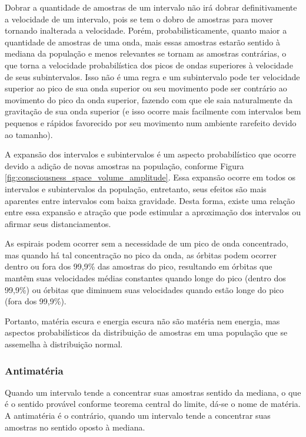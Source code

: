 Dobrar a quantidade de amostras de um intervalo não irá dobrar definitivamente a velocidade de um intervalo, pois se tem o dobro de amostras para mover tornando inalterada a velocidade. Porém, probabilisticamente, quanto maior a quantidade de amostras de uma onda, mais essas amostras estarão sentido à mediana da população e menos relevantes se tornam as amostras contrárias, o que torna a velocidade probabilística dos picos de ondas superiores à velocidade de seus subintervalos. Isso não é uma regra e um subintervalo pode ter velocidade superior ao pico de sua onda superior ou seu movimento pode ser contrário ao movimento do pico da onda superior, fazendo com que ele saia naturalmente da gravitação de sua onda superior (e isso ocorre mais facilmente com intervalos bem pequenos e rápidos favorecido por seu movimento num ambiente rarefeito devido ao tamanho). 

A expansão dos intervalos e subintervalos é um aspecto probabilístico que ocorre devido a adição de novas amostras na população, conforme Figura \ref{fig:consciousness_space_volume_amplitude}. Essa expansão ocorre em todos os intervalos e subintervalos da população, entretanto, seus efeitos são mais aparentes entre intervalos com baixa gravidade. Desta forma, existe uma relação entre essa expansão e atração que pode estimular a aproximação dos intervalos ou afirmar seus distanciamentos. 

As espirais podem ocorrer sem a necessidade de um pico de onda concentrado, mas quando há tal concentração no pico da onda, as órbitas podem ocorrer dentro ou fora dos 99,9\% das amostras do pico, resultando em órbitas que mantêm suas velocidades médias constantes quando longe do pico (dentro dos 99,9\%) ou órbitas que diminuem suas velocidades quando estão longe do pico (fora dos 99,9\%).

Portanto, matéria escura e energia escura não são matéria nem energia, mas aspectos probabilísticos da distribuição de amostras em uma população que se assemelha à distribuição normal.

\subsubsection{Antimatéria}
Quando um intervalo tende a concentrar suas amostras sentido da mediana, o que é o sentido provável conforme teorema central do limite, dá-se o nome de matéria. A antimatéria é o contrário, quando um intervalo tende a concentrar suas amostras no sentido oposto à mediana. 

